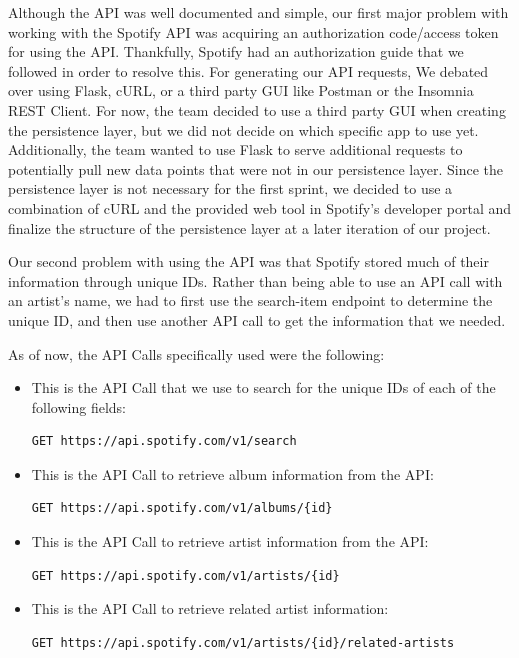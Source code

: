 \documentclass{scrartcl}
\begin{document}
Although the API was well documented and simple, our first major problem with working with the Spotify API was acquiring an authorization code/access token for using the API. Thankfully, Spotify had an authorization guide that we followed in order to resolve this. For generating our API requests, We debated over using Flask, cURL, or a third party GUI like Postman or the Insomnia REST Client. For now, the team decided to use a third party GUI when creating the persistence layer, but we did not decide on which specific app to use yet. Additionally, the team wanted to use Flask to serve additional requests to potentially pull new data points that were not in our persistence layer. Since the persistence layer is not necessary for the first sprint, we decided to use a combination of cURL and the provided web tool in Spotify’s developer portal and finalize the structure of the persistence layer at a later iteration of our project.

Our second problem with using the API was that Spotify stored much of their information through unique IDs. Rather than being able to use an API call with an artist’s name, we had to first use the search-item endpoint to determine the unique ID, and then use another API call to get the information that we needed.

As of now, the API Calls specifically used were the following:

\begin{itemize}
    \item This is the API Call that we use to search for the unique IDs of each of the following fields:
    \begin{verbatim}GET https://api.spotify.com/v1/search\end{verbatim}

    \item This is the API Call to retrieve album information from the API:
    \begin{verbatim}GET https://api.spotify.com/v1/albums/{id}\end{verbatim}

    \item This is the API Call to retrieve artist information from the API:
    \begin{verbatim}GET https://api.spotify.com/v1/artists/{id}\end{verbatim}

    \item This is the API Call to retrieve related artist information:
    \begin{verbatim}GET https://api.spotify.com/v1/artists/{id}/related-artists\end{verbatim}
\end{itemize}
\end{document}
